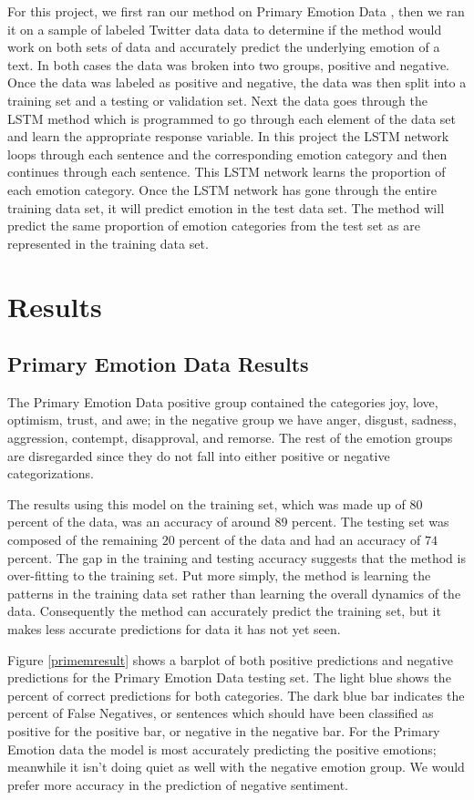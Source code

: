 \documentclass[titlepage,letterpaper]{article}
\begin{document}
For this project, we first ran our method on Primary Emotion Data \cite{lowriwilliams}, then we ran it on a sample of labeled Twitter data \cite{LabeledTwitter} data to determine if the method would work on both sets of data and accurately predict the underlying emotion of a text. In both cases the data was broken into two groups, positive and negative. Once the data was labeled as positive and negative, the data was then split into a training set and a testing or validation set. Next the data goes through the LSTM method which is programmed to go through each element of the data set and learn the appropriate response variable. In this project the LSTM network loops through each sentence and the corresponding emotion category and then continues through each sentence. This LSTM network learns the proportion of each emotion category. Once the LSTM network has gone through the entire training data set, it will predict emotion in the test data set. The method will predict the same proportion of emotion categories from the test set as are represented in the training data set. 

\section{Results}

\subsection{Primary Emotion Data Results}
The Primary Emotion Data positive group contained the categories joy, love, optimism, trust, and awe; in the negative group we have anger, disgust, sadness, aggression, contempt, disapproval, and remorse. The rest of the emotion groups are disregarded since they do not fall into either positive or negative categorizations.

The results using this model on the training set, which was made up of $80$ percent of the data, was an accuracy of around $89$ percent. The testing set was composed of the remaining $20$ percent of the data and had an accuracy of $74$ percent. The gap in the training and testing accuracy suggests that the method is over-fitting to  the training set. Put more simply, the method is learning the patterns in the training data set rather than learning the overall dynamics of the data. Consequently the method can accurately predict the training set, but it makes less accurate predictions for data it has not yet seen.

Figure \ref{primemresult} shows a barplot of both positive predictions and negative predictions for the Primary Emotion Data testing set. The light blue shows the percent of correct predictions for both categories. The dark blue bar indicates the percent of False Negatives, or sentences which should have been classified as positive for the positive bar, or negative in the negative bar. For the Primary Emotion data the model is most accurately predicting the positive emotions; meanwhile it isn't doing quiet as well with the negative emotion group. We would prefer more accuracy in the prediction of negative sentiment. 
\end{document}
